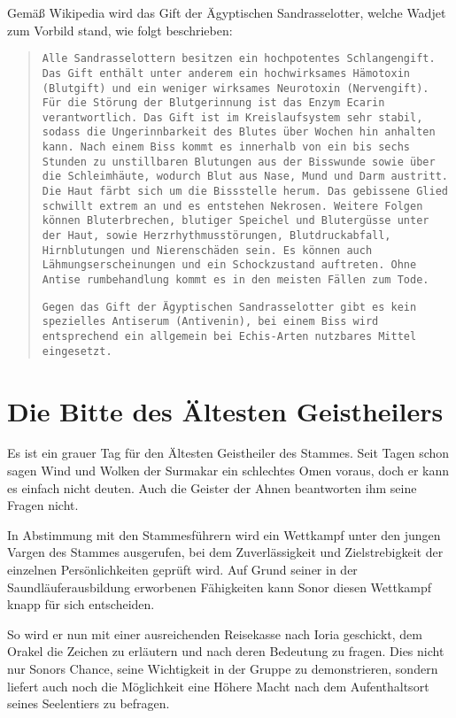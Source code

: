 \documentclass[a4paper]{scrreprt}
\begin{document}
	Gemäß Wikipedia wird das Gift der Ägyptischen Sandrasselotter, welche Wadjet zum Vorbild stand, wie folgt beschrieben:
	
	\begin{quotation}
		\texttt{Alle Sandrasselottern besitzen ein hochpotentes Schlangengift. Das Gift enthält	unter anderem ein hochwirksames Hämotoxin (Blutgift) und ein weniger wirksames Neurotoxin (Nervengift). Für die Störung der Blutgerinnung ist das Enzym Ecarin verantwortlich. Das Gift ist im Kreislaufsystem sehr stabil, sodass die	Ungerinnbarkeit des Blutes über Wochen hin anhalten kann. Nach einem Biss kommt es innerhalb von ein bis sechs Stunden zu unstillbaren Blutungen aus der
		Bisswunde sowie über die Schleimhäute, wodurch Blut aus Nase, Mund und Darm
		austritt. Die Haut färbt sich um die Bissstelle herum. Das gebissene Glied
		schwillt extrem an und es entstehen Nekrosen. Weitere Folgen können
		Bluterbrechen, blutiger Speichel und Blutergüsse unter der Haut, sowie
		Herzrhythmusstörungen, Blutdruckabfall, Hirnblutungen und Nierenschäden sein. Es
		können auch Lähmungserscheinungen und ein Schockzustand auftreten. Ohne
		Antise rumbehandlung kommt es in den meisten Fällen zum Tode.}

		\texttt{Gegen das Gift der Ägyptischen Sandrasselotter gibt es kein spezielles Antiserum (Antivenin), bei einem Biss wird entsprechend ein allgemein bei Echis-Arten	nutzbares Mittel eingesetzt.}
\end{quotation}

\section{Die Bitte des Ältesten Geistheilers}
Es ist ein grauer Tag für den Ältesten Geistheiler des Stammes. Seit Tagen schon sagen Wind und Wolken der Surmakar ein schlechtes Omen voraus, doch er kann es einfach nicht deuten. Auch die Geister der Ahnen beantworten ihm seine Fragen nicht.

In Abstimmung mit den Stammesführern wird ein Wettkampf unter den jungen Vargen des Stammes ausgerufen, bei dem Zuverlässigkeit und Zielstrebigkeit der einzelnen Persönlichkeiten geprüft wird. 
Auf Grund seiner in der Saundläuferausbildung erworbenen Fähigkeiten kann Sonor diesen Wettkampf knapp für sich entscheiden.

So wird er nun mit einer ausreichenden Reisekasse nach Ioria geschickt, dem Orakel die Zeichen zu erläutern und nach deren Bedeutung zu fragen.
Dies nicht nur Sonors Chance, seine Wichtigkeit in der Gruppe zu demonstrieren, sondern liefert auch noch die Möglichkeit eine Höhere Macht nach dem Aufenthaltsort seines Seelentiers zu befragen.
\end{document}
